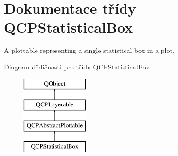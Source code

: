 \hypertarget{classQCPStatisticalBox}{}\section{Dokumentace třídy Q\+C\+P\+Statistical\+Box}
\label{classQCPStatisticalBox}


A plottable representing a single statistical box in a plot.  


Diagram dědičnosti pro třídu Q\+C\+P\+Statistical\+Box\begin{figure}[H]
\begin{center}
\leavevmode
\includegraphics[height=4.000000cm]{classQCPStatisticalBox}
\end{center}
\end{figure}
